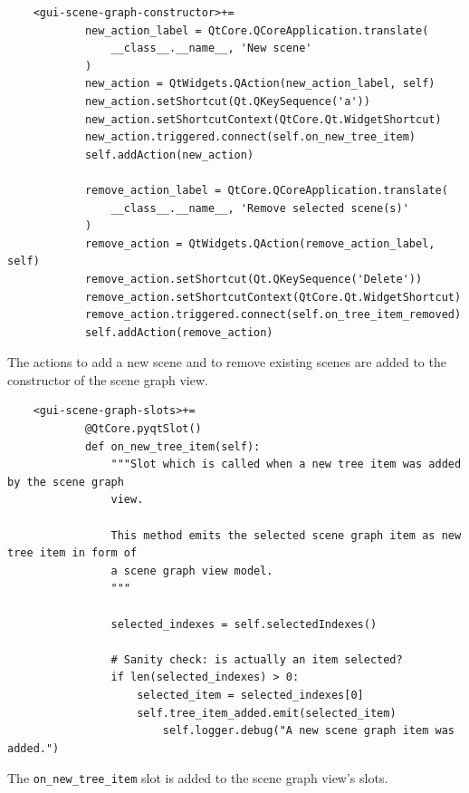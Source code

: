 \documentclass[10pt, openright, notitlepage]{scrreprt}
\begin{document}
\begin{listing}[H]
\begin{verbatim}
    <gui-scene-graph-constructor>+=
            new_action_label = QtCore.QCoreApplication.translate(
                __class__.__name__, 'New scene'
            )
            new_action = QtWidgets.QAction(new_action_label, self)
            new_action.setShortcut(Qt.QKeySequence('a'))
            new_action.setShortcutContext(QtCore.Qt.WidgetShortcut)
            new_action.triggered.connect(self.on_new_tree_item)
            self.addAction(new_action)
            
            remove_action_label = QtCore.QCoreApplication.translate(
                __class__.__name__, 'Remove selected scene(s)'
            )
            remove_action = QtWidgets.QAction(remove_action_label, self)
            remove_action.setShortcut(Qt.QKeySequence('Delete'))
            remove_action.setShortcutContext(QtCore.Qt.WidgetShortcut)
            remove_action.triggered.connect(self.on_tree_item_removed)
            self.addAction(remove_action)
\end{verbatim}
\caption{\label{lst:gui-scene-graph-constructor-01}
The actions to add a new scene and to remove existing scenes are added to the constructor of the scene graph view.}
\end{listing}

\begin{listing}[H]
\begin{verbatim}
    <gui-scene-graph-slots>+=
            @QtCore.pyqtSlot()
            def on_new_tree_item(self):
                """Slot which is called when a new tree item was added by the scene graph
                view.
            
                This method emits the selected scene graph item as new tree item in form of
                a scene graph view model.
                """
            
                selected_indexes = self.selectedIndexes()
            
                # Sanity check: is actually an item selected?
                if len(selected_indexes) > 0:
                    selected_item = selected_indexes[0]
                    self.tree_item_added.emit(selected_item)
                        self.logger.debug("A new scene graph item was added.")
\end{verbatim}
\caption{\label{lst:gui-scene-graph-slots-on-tree-item-added}
The \texttt{on\_new\_tree\_item} slot is added to the scene graph view's slots.}
\end{listing}
\end{document}
